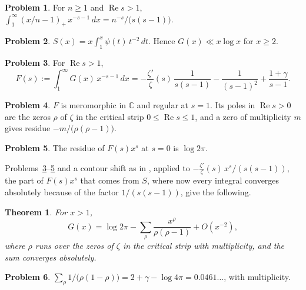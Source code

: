 \documentclass[reqno]{amsart}
\theoremstyle{definition}
\newtheorem{problem}{Problem}[section]
\theoremstyle{plain}
\newtheorem{theorem}{Theorem}[section]
\newcommand{\C}{\mathbb{C}}
\renewcommand{\Re}{\operatorname{Re}}
\begin{document}
\begin{problem}\label{pr:ramp-mellin}
For $n \ge 1$ and $\Re s > 1$,
\(
  \int_1^\infty (x/n - 1)_+ \, x^{-s-1} \, d x = n^{-s}/\bigl(s(s-1)\bigr)
\).
\end{problem}

\begin{problem}\label{pr:S-integral}
$S(x) = x \int_1^x \psi(t) \, t^{-2} \, d t$.  Hence $G(x) \ll x \log x$ for $x \ge 2$.
\end{problem}

\begin{problem}\label{pr:F}
For $\Re s > 1$,
\begin{equation}\label{eq:F}
  F(s) := \int_1^\infty G(x)\, x^{-s-1} \, d x
  = -\frac{\zeta'}{\zeta}(s) \, \frac{1}{s(s-1)} - \frac{1}{(s-1)^2} + \frac{1 + \gamma}{s - 1} .
\end{equation}
\end{problem}

\begin{problem}\label{pr:F-poles}
$F$ is meromorphic in $\C$ and regular at $s = 1$.  Its poles in $\Re s > 0$ are the zeros $\rho$ of $\zeta$ in the critical strip $0 \le \Re s \le 1$, and a zero of multiplicity $m$ gives residue $-m/\bigl(\rho(\rho - 1)\bigr)$.
\end{problem}

\begin{problem}\label{pr:residue-zero}
The residue of $F(s) x^s$ at $s = 0$ is $\log 2\pi$.
\end{problem}

Problems~\ref{pr:F}--\ref{pr:residue-zero} and a contour shift as in \cite[Ch.~17]{Dav}, applied to $-\frac{\zeta'}{\zeta}(s)\, x^s/(s(s-1))$, the part of $F(s) x^s$ that comes from $S$, where now every integral converges absolutely because of the factor $1/(s(s-1))$, give the following.

\begin{theorem}\label{thm:explicit}
For $x > 1$,
\[
  G(x) = \log 2\pi - \sum_\rho \frac{x^\rho}{\rho(\rho - 1)} + O(x^{-2}) ,
\]
where $\rho$ runs over the zeros of $\zeta$ in the critical strip with multiplicity, and the sum converges absolutely.
\end{theorem}

\begin{problem}\label{pr:sum-rho}
$\sum_\rho 1/\bigl(\rho(1 - \rho)\bigr) = 2 + \gamma - \log 4\pi = 0.0461\ldots$, with multiplicity.
\end{problem}
\end{document}
